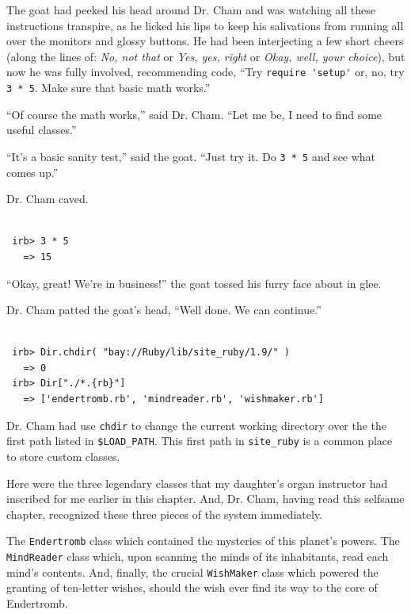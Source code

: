 \documentclass[10pt,twoside]{report}
\begin{document}
The goat had peeked his head around Dr. Cham and was watching all
these instructions transpire, as he licked his lips to keep his
salivations from running all over the monitors and glossy buttons.  He
had been interjecting a few short cheers (along the lines of: {\em No,
  not that} or {\em Yes, yes, right} or {\em Okay, well, your
  choice}), but now he was fully involved, recommending code, ``Try
\lstinline[breaklines=true]|require 'setup'| or, no, try
\lstinline[breaklines=true]|3 * 5|.  Make sure that basic math
works.''

``Of course the math works,'' said Dr. Cham.  ``Let me be, I need to
find some useful classes.''

``It's a basic sanity test,'' said the goat.  ``Just try it.  Do
\lstinline[breaklines=true]|3 * 5| and see what comes up.''

Dr. Cham caved.


\begin{lstlisting}

 irb> 3 * 5
   => 15

\end{lstlisting}


``Okay, great!  We're in business!'' the goat tossed his furry face
about in glee.

Dr. Cham patted the goat's head, ``Well done.  We can continue.''


\begin{lstlisting}

 irb> Dir.chdir( "bay://Ruby/lib/site_ruby/1.9/" )
   => 0
 irb> Dir["./*.{rb}"]
   => ['endertromb.rb', 'mindreader.rb', 'wishmaker.rb']

\end{lstlisting}


Dr. Cham had use \lstinline[breaklines=true]|chdir| to change the
current working directory over the the first path listed in
\lstinline[breaklines=true]|$LOAD_PATH|.  This first path in
\lstinline[breaklines=true]|site_ruby| is a common place to store
custom classes.

Here were the three legendary classes that my daughter's organ
instructor had inscribed for me earlier in this chapter.  And,
Dr. Cham, having read this selfsame chapter, recognized these three
pieces of the system immediately.

The \lstinline[breaklines=true]|Endertromb| class which contained the
mysteries of this planet's powers.  The
\lstinline[breaklines=true]|MindReader| class which, upon scanning the
minds of its inhabitants, read each mind's contents.  And, finally,
the crucial \lstinline[breaklines=true]|WishMaker| class which powered
the granting of ten-letter wishes, should the wish ever find its way
to the core of Endertromb.
\end{document}
